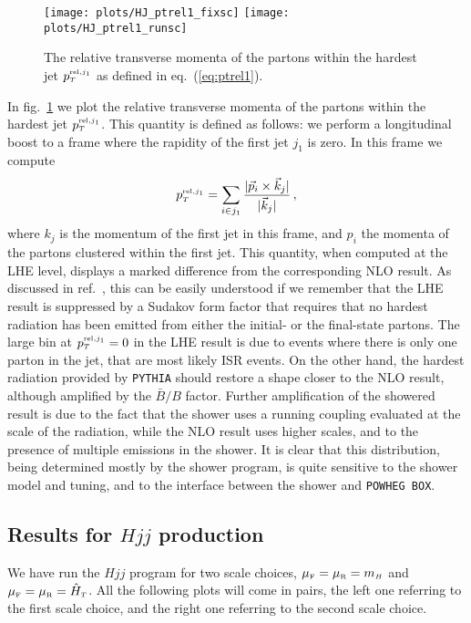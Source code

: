 \documentclass[paper]{JHEP3}
\newlength{\hfig}
\newcommand\PYTHIA{{\tt PYTHIA}}
\newcommand\muf{\mu_{\sss\rm F}}
\newcommand\mur{\mu_{\sss\rm R}}
\newcommand\mH{m_{\sss  H}}
\newcommand\HThat{\hat{H}_{\sss  T}}
\newcommand\ptrelone{p_{\sss T}^{\sss {\rm rel},j_1}}
\newcommand\sss{\mathchoice%
{\displaystyle}%
{\scriptstyle}%
{\scriptscriptstyle}%
{\scriptscriptstyle}%
}
\newcommand\POWHEGBOX{{\tt POWHEG BOX}}
\begin{document}
\begin{figure}[htb]
\begin{center}
\texttt{[image: plots/HJ\_ptrel1\_fixsc]}\nolinebreak
\texttt{[image: plots/HJ\_ptrel1\_runsc]}
\caption{The relative transverse momenta of the partons within the hardest
  jet $\ptrelone$ as defined in eq.~(\ref{eq:ptrel1}).}
\label{fig:HJ_ptrel1}
\end{center}
\end{figure}
In fig.~\ref{fig:HJ_ptrel1} we plot the relative transverse momenta of the
partons within the hardest jet $\ptrelone$.  This quantity is defined as
follows: we perform a longitudinal boost to a frame where the rapidity of the
first jet $j_1$ is zero. In this frame we compute
\begin{equation}
\label{eq:ptrel1}
p_{\sss T}^{ \sss {\rm rel},j_1}=\sum_{i\in j_1}
\frac{|\vec{p}_i\times \vec{k}_j|}{|\vec{k}_j|}\,,
\end{equation}
where $k_j$ is the momentum of the first jet in this frame, and $p_i$ the
momenta of the partons clustered within the first jet.  This quantity, when
computed at the LHE level, displays a marked difference from the
corresponding NLO result. As discussed in ref.~\cite{Alioli:2010xa}, this can
be easily understood if we remember that the LHE result is suppressed by a
Sudakov form factor that requires that no hardest radiation has been emitted
from either the initial- or the final-state partons.  The large bin at
$\ptrelone=0$ in the LHE result is due to events where there is only one
parton in the jet, that are most likely ISR events. On the other hand, the
hardest radiation provided by \PYTHIA{} should restore a shape closer to the
NLO result, although amplified by the $\bar{B}/B$ factor.  Further
amplification of the showered result is due to the fact that the shower uses
a running coupling evaluated at the scale of the radiation, while the NLO
result uses higher scales, and to the presence of multiple emissions in the
shower.  It is clear that this distribution, being determined mostly by the
shower program, is quite sensitive to the shower model and tuning, and to the
interface between the shower and \POWHEGBOX{}.

\clearpage
\subsection{Results for $Hjj$ production}
We have run the $Hjj$ program for two scale choices, $\muf=\mur=\mH$
and $\muf=\mur=\HThat$. All the following plots will come in pairs,
the left one referring to the first scale choice, and the right one referring to
the second scale choice.
\end{document}
